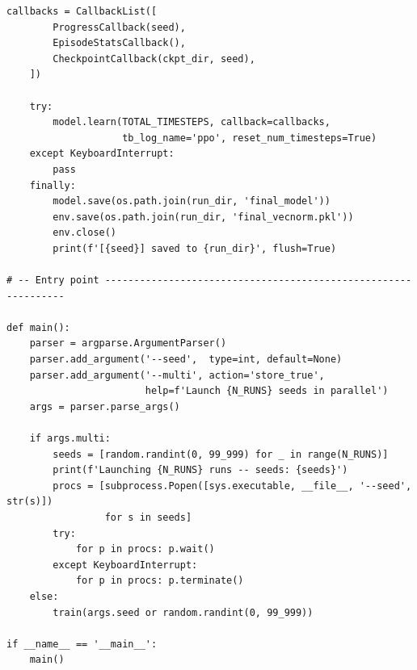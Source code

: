 \documentclass[10pt, a4paper]{article}
\begin{document}
\begin{lstlisting}[caption={v3\_stable\_train.py --- PPO training entry point}, label=lst:train]
    callbacks = CallbackList([
        ProgressCallback(seed),
        EpisodeStatsCallback(),
        CheckpointCallback(ckpt_dir, seed),
    ])

    try:
        model.learn(TOTAL_TIMESTEPS, callback=callbacks,
                    tb_log_name='ppo', reset_num_timesteps=True)
    except KeyboardInterrupt:
        pass
    finally:
        model.save(os.path.join(run_dir, 'final_model'))
        env.save(os.path.join(run_dir, 'final_vecnorm.pkl'))
        env.close()
        print(f'[{seed}] saved to {run_dir}', flush=True)

# -- Entry point ---------------------------------------------------------------

def main():
    parser = argparse.ArgumentParser()
    parser.add_argument('--seed',  type=int, default=None)
    parser.add_argument('--multi', action='store_true',
                        help=f'Launch {N_RUNS} seeds in parallel')
    args = parser.parse_args()

    if args.multi:
        seeds = [random.randint(0, 99_999) for _ in range(N_RUNS)]
        print(f'Launching {N_RUNS} runs -- seeds: {seeds}')
        procs = [subprocess.Popen([sys.executable, __file__, '--seed', str(s)])
                 for s in seeds]
        try:
            for p in procs: p.wait()
        except KeyboardInterrupt:
            for p in procs: p.terminate()
    else:
        train(args.seed or random.randint(0, 99_999))

if __name__ == '__main__':
    main()
\end{lstlisting}
\end{document}
